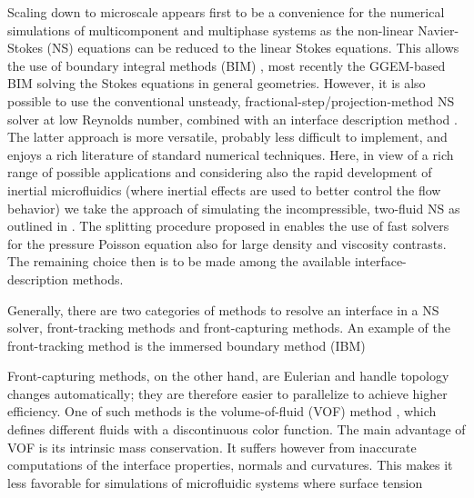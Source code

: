 Scaling down to microscale appears first to be a convenience for the numerical simulations of multicomponent and multiphase systems as the non-linear Navier-Stokes (NS) equations can be reduced to the linear Stokes equations. This allows the use of boundary integral methods (BIM) \citep{Pozrikidis}, \eg most recently the GGEM-based BIM \citep{Kumar_JCP_2012, Lailai_SM_2014} solving the Stokes equations in general geometries. However, it is also possible to use the conventional unsteady, fractional-step/projection-method NS solver at low Reynolds number, combined with an interface description method \citep{Worner_2012, Galusinski_JCP_2008}. The latter approach is more versatile, probably less difficult to implement, and enjoys a rich literature of standard numerical techniques. Here, in view of a rich range of possible applications and considering also the rapid development of inertial microfluidics (where inertial effects are used to better control the flow behavior) we take the approach of simulating the incompressible, two-fluid NS as outlined in \cite{Dodd_JCP_2014}. The splitting procedure proposed in \cite{Dodd_JCP_2014} enables the use of fast solvers for the pressure Poisson equation also for large density and viscosity contrasts. The remaining choice then is to be made among the available interface-description methods. 

Generally, there are two categories of methods to resolve an interface in a NS solver, \ie front-tracking methods and front-capturing methods. An example of the front-tracking method is the immersed boundary method (IBM) 

Front-capturing methods, on the other hand, are Eulerian and handle topology changes automatically; they are therefore easier to parallelize to achieve higher efficiency. One of such methods is the volume-of-fluid (VOF) method \citep{Scardovelli_ARFM_1999}, which defines different fluids with a discontinuous color function. The main advantage of VOF is its intrinsic mass conservation. It suffers however from inaccurate computations of the interface properties, \eg normals and curvatures. This makes it less favorable for simulations of microfluidic systems where surface tension 

